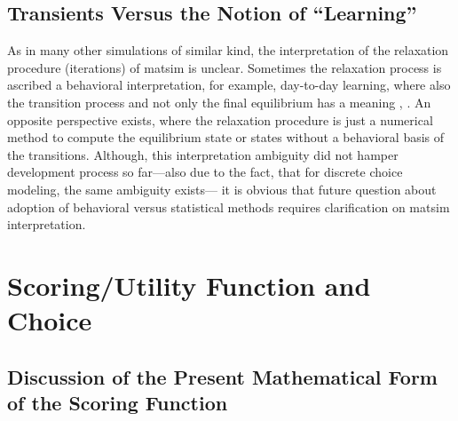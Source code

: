 
\subsection{Transients Versus the Notion of \enquote{Learning}}
\label{sec:transients-vs-learning}

As in many other simulations of similar kind, the interpretation of the relaxation procedure (iterations) of \gls{matsim} is unclear. 
%
Sometimes the relaxation process is ascribed a behavioral interpretation, for example, day-to-day learning, where also the transition process and not only the final equilibrium has a meaning \citep[][p.128]{LiuEtAl_TransResA_2006}, \citep[][p.523]{NagelBarrett1997feedback}. 
%
An opposite perspective exists, where the relaxation procedure is just a numerical method to compute the equilibrium state or states without a behavioral basis of the transitions.
%
Although, this interpretation ambiguity did not hamper development process so far---also due to the fact, that for discrete choice modeling, the same ambiguity exists---
it is obvious that future question about adoption of behavioral versus statistical methods 
requires clarification on \gls{matsim} interpretation.


\section{Scoring/Utility Function and Choice}
\label{sec:future-of-scoring-function}

\subsection{Discussion of the Present Mathematical Form of the Scoring Function}
\label{sec:discussion-present-math-form}

